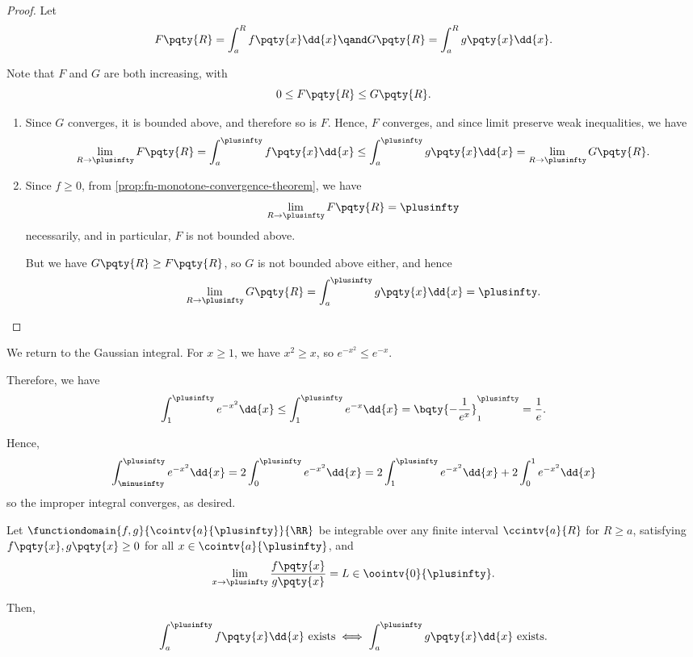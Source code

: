 \begin{proof}
    Let
    \[
        F\pqty{R} = \int_{a}^{R} f\pqty{x} \dd{x} \qand G\pqty{R} = \int_{a}^{R} g\pqty{x} \dd{x}.
    \]

    Note that \(F\) and \(G\) are both increasing, with
    \[
        0 \leq F\pqty{R} \leq G\pqty{R}.
    \]

    \begin{enumerate}
        \item Since \(G\) converges, it is bounded above, and therefore so is \(F\). Hence, \(F\) converges, and since limit preserve weak inequalities, we have
        \[
            \lim_{R \to \plusinfty} F\pqty{R} = \int_{a}^{\plusinfty} f\pqty{x} \dd{x} \leq \int_{a}^{\plusinfty} g\pqty{x} \dd{x} = \lim_{R \to \plusinfty} G\pqty{R}.
        \]
        

        \item Since \(f \geq 0\), from \autoref{prop:fn-monotone-convergence-theorem}, we have
        \[
            \lim_{R \to \plusinfty} F\pqty{R} = \plusinfty
        \]
        necessarily, and in particular, \(F\) is not bounded above.

        But we have \(G\pqty{R} \geq F\pqty{R}\), so \(G\) is not bounded above either, and hence
        \[
            \lim_{R \to \plusinfty} G\pqty{R} = \int_{a}^{\plusinfty} g\pqty{x} \dd{x} = \plusinfty.
        \]
    \end{enumerate}
\end{proof}

\begin{example}
    \label{ex:app-direct-comparison-test}%
    We return to the Gaussian integral. For \(x \geq 1\), we have \(x^2 \geq x\), so \(e^{-x^2} \leq e^{-x}\).

    Therefore, we have
    \[
        \int_{1}^{\plusinfty} e^{-x^2} \dd{x} \leq \int_{1}^{\plusinfty} e^{-x} \dd{x} = \bqty{- \frac{1}{e^x}}^{\plusinfty}_{1} = \frac{1}{e}.
    \]

    Hence,
    \[
        \int_{\minusinfty}^{\plusinfty} e^{-x^2} \dd{x} = 2 \int_{0}^{\plusinfty} e^{-x^2} \dd{x} = 2 \int_{1}^{\plusinfty} e^{-x^2} \dd{x} + 2 \int_{0}^{1} e^{-x^2} \dd{x}
    \]
    so the improper integral converges, as desired.
\end{example}

\begin{proposition}
    \label{prop:int-test-ratio}%
    Let \(\functiondomain{f, g}{\cointv{a}{\plusinfty}}{\RR}\) be integrable over any finite interval \(\ccintv{a}{R}\) for \(R \geq a\), satisfying \(f\pqty{x}, g\pqty{x} \geq 0\) for all \(x \in \cointv{a}{\plusinfty}\), and
    \[
        \lim_{x \to \plusinfty} \frac{f\pqty{x}}{g\pqty{x}} = L \in \oointv{0}{\plusinfty}.
    \]

    Then,
    \[
        \int_{a}^{\plusinfty} f\pqty{x} \dd{x} \text{ exists} \iff \int_{a}^{\plusinfty} g\pqty{x} \dd{x} \text{ exists}.
    \]
\end{proposition}

